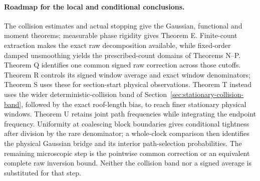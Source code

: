 \documentclass[11pt,reqno]{amsart}
\numberwithin{equation}{section}
\theoremstyle{definition}\newtheorem{definition}[theorem]{Definition}
\theoremstyle{remark}\newtheorem{remark}[theorem]{Remark}
\begin{document}
\paragraph{Roadmap for the local and conditional conclusions.}
The collision estimates and actual stopping give the Gaussian,
functional and moment theorems; measurable phase rigidity gives
Theorem E. Finite-count extraction makes the exact raw decomposition
available, while fixed-order damped unsmoothing yields the
prescribed-count domains of Theorems N--P. Theorem Q identifies one
common signed raw correction across those cutoffs. Theorem R controls
its signed window average and exact window denominators; Theorem S
uses these for section-start physical observations. Theorem T instead
uses the wider deterministic-collision band of
Section~\ref{sec:stationary-collision-band}, followed by the exact
roof-length bias, to reach finer stationary physical windows.
Theorem U retains joint path frequencies while integrating the endpoint
frequency. Uniformity at coalescing block boundaries gives conditional
tightness after division by the rare denominator; a whole-clock
comparison then identifies the physical Gaussian bridge and its
interior path-selection probabilities.
The remaining microscopic step is the pointwise common correction
or an equivalent complete raw inversion bound. Neither the collision
band nor a signed average is substituted for that step.
\end{document}
